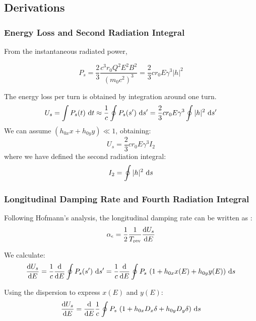 \subsection{Derivations}
\subsubsection{Energy Loss and Second Radiation Integral}
\label{sec:enelossandi2}

From the instantaneous radiated power,

\begin{equation}
    P_s = \frac{2}{3}\frac{c^3 r_0 Q^2 E^2 B^2}{(m_0 c^2)^3} = \frac{2}{3} c r_0 E \gamma^3 |h|^2
    \label{eq:instpower}
\end{equation}

The energy loss per turn is obtained by integration around one turn.
\begin{equation}
U_s = \int P_s(t) \ \text{d} t \approx \frac{1}{c} \oint P_s(s') \ \text{d} s'
= \frac{2}{3} c r_0 E \gamma^3 \oint |h|^2 \ \text{d} s'
\end{equation}
We can assume $(h_{0x}x + h_{0y}y) \ll 1$, obtaining:
\begin{equation}
\label{eq:enelossturn}
U_s =\frac{2}{3} c r_0 E \gamma^3 I_{2}
\end{equation}
where we have defined the second radiation integral:
\begin{equation}
I_2     = \oint |h|^2 \ \text{d} s
\end{equation}

\subsubsection{Longitudinal Damping Rate and Fourth Radiation Integral}
\label{sec:longdampandi4}

Following Hofmann's analysis, the longitudinal damping rate can be written as \cite{hofmann_2004}:
\begin{equation}
    \alpha_\epsilon = \frac{1}{2} \frac{1}{T_\text{rev}} \frac{\text{d} {U_s}}{\text{d} {E}}
    \label{eq:alphadamp}
\end{equation}

We calculate:
\begin{equation}
    \frac{\text{d} {U_s}}{\text{d} {E}} = \frac{1}{c} \frac{\text{d} {}}{\text{d} {E}} \oint P_s(s') \ \text{d} s' = \frac{1}{c} \frac{\text{d} {}}{\text{d} {E}} \oint P_s \ (1 + h_{0x}x(E) + h_{0y}y(E))\ \text{d} s
    \label{eq:dUdEoint}
\end{equation}

Using the dispersion to express $x(E)$ and $y(E)$:
\begin{equation}
    \frac{\text{d} {U_s}}{\text{d} {E}} = \frac{\text{d} {}}{\text{d} {E}} \frac{1}{c} \oint P_s \ (1 + h_{0x}D_x \delta + h_{0y} D_y \delta)\ \text{d} s
\end{equation}


